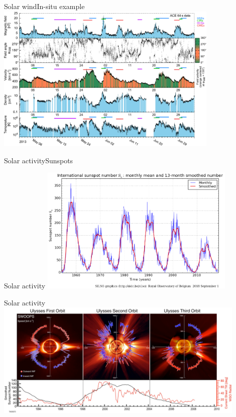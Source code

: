 \begin{frame}[c]{Solar wind}{In-situ example}
	\includegraphics[width=0.8\textwidth]{../figures_of_mine/gnuplots/ACE_64s_v7_thesis_CIRs_2013-5-1_65_plot.pdf}
\end{frame}

\begin{frame}[c]{Solar activity}{Sunspots}
	\centering
\end{frame}
\begin{frame}[c]{Solar activity}{}
	\centering
	\includegraphics[width=0.7\textwidth]{../figures_of_others/images/ROB_SILSO_SSN_wolfmms_cropped.png}

	\vfill\hfill \hyperlink{butterfly}{}
\end{frame}
\begin{frame}[c]{Solar activity}{}
	\includegraphics[width=0.9\textwidth]{../figures_of_others/images/McComas2008_Ulysses_orbit_.png}
\end{frame}


